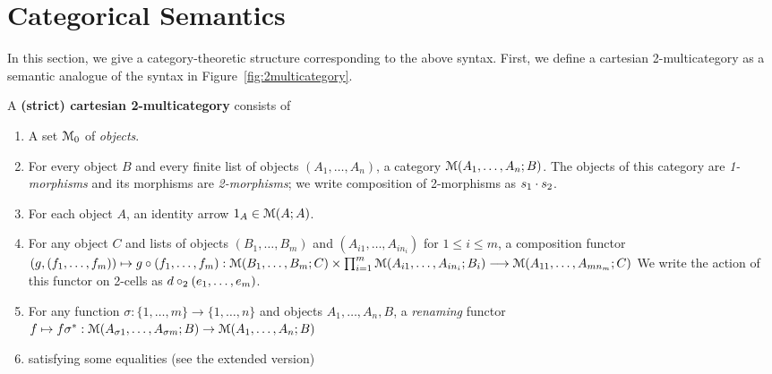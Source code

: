 \newcommand\cD{\ensuremath{\mathcal{D}}}
\newcommand\IndF[3]{\ensuremath{{#1}^\Fsymb_{{#2},{#3}}}}
\newcommand\IndU[4]{\ensuremath{{#1}^\Usymb_{{#2},{#3},{#4}}}}

\section{Categorical Semantics}
\label{sec:semantics}

In this section, we give a category-theoretic structure corresponding to
the above syntax.  First, we define a cartesian 2-multicategory as a
semantic analogue of the syntax in Figure~\ref{fig:2multicategory}. 


\begin{definition}
  A \textbf{(strict) cartesian 2-multicategory} consists of
  \begin{enumerate}
  \item A set $\mathcal{M}_0$ of \emph{objects}.
  \item For every object $B$ and every finite list of objects $(A_1,\dots,A_n)$, a category $\mathcal{M}(A_1,\dots,A_n;B)$.
    The objects of this category are \emph{1-morphisms} and its morphisms are \emph{2-morphisms}; we write composition of 2-morphisms as $s_1 \cdot s_2$.
  \item For each object $A$, an identity arrow $1_A\in\mathcal{M}(A;A)$.
  \item For any object $C$ and lists of objects $(B_1,\dots,B_m)$ and
    $(A_{i1},\dots,A_{in_i})$ for $1\le i\le m$, a composition functor
    $(g,(f_1,\dots,f_m)) \mapsto g\circ (f_1,\dots,f_m) : 
    \mathcal{M}(B_1,\dots,B_m;C) \times \prod_{i=1}^m \mathcal{M}(A_{i1},\dots,A_{in_i};B_i) \longrightarrow \mathcal{M}(A_{11},\dots,A_{mn_m};C)$
    We write the action of this functor on 2-cells as $d \mathbin{\circ_2} (e_1,\dots,e_m)$.
  \item For any function $\sigma : \{1,\dots,m\} \to \{1,\dots,n\}$ and
    objects $A_1,\dots,A_n,B$, a \emph{renaming} functor $f \mapsto
    f\sigma^* : \mathcal{M}(A_{\sigma 1},\dots,A_{\sigma m}; B) \to \mathcal{M}(A_1,\dots,A_n;B)$
  \item satisfying some equalities (see the extended version)
  \end{enumerate}
\end{definition}

